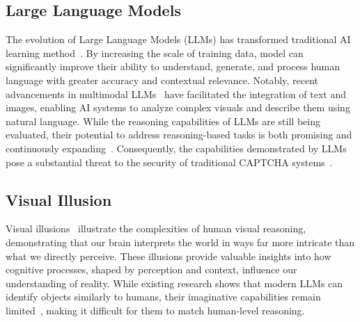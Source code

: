 \subsection{Large Language Models}
The evolution of Large Language Models (LLMs) has transformed traditional AI learning method~\cite{achiam2023gpt}. By increasing the scale of training data, model can significantly improve their ability to understand, generate, and process human language with greater accuracy and contextual relevance. Notably, recent advancements in multimodal LLMs~\cite{GPT4-o,bai2023qwen} have facilitated the integration of text and images, enabling AI systems to analyze complex visuals and describe them using natural language. While the reasoning capabilities of LLMs are still being evaluated, their potential to address reasoning-based tasks is both promising and continuously expanding~\cite{sun2024determlr}. Consequently, the capabilities demonstrated by LLMs pose a substantial threat to the security of traditional CAPTCHA systems~\cite{deng2024oedipus}.

\subsection{Visual Illusion}
Visual illusions~\cite{gurnsey1992parallel,von1989mechanisms,krizhevsky2009learning} illustrate the complexities of human visual reasoning, demonstrating that our brain interprets the world in ways far more intricate than what we directly perceive. These illusions provide valuable insights into how cognitive processes, shaped by perception and context, influence our understanding of reality. While existing research shows that modern LLMs can identify objects similarly to humans, their imaginative capabilities remain limited~\cite{chakrabarty2024art}, making it difficult for them to match human-level reasoning. 









